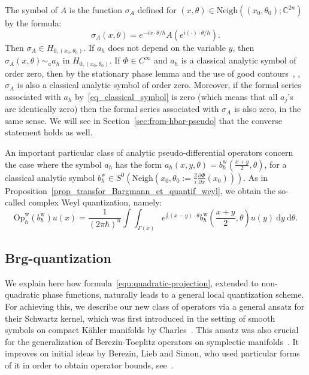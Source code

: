 \documentclass{article}
\newcommand{\Vois}{\mathrm{Neigh}}
\newcommand{\Op}{\mathrm{Op}}
\newcommand{\w}{\mathrm{w}}
\newcommand{\DD}{\:\!\mathrm{d}}
\newcommand{\intint}{\int\!\!\!\!\int}
\newcommand{\CM}{\mathbb{C}}
\newcommand{\h}{\hbar}
\begin{document}
The symbol of $A$ is the function $\sigma_A$ defined for
$(x, \theta) \in \Vois \left( (x_0, \theta_0); \CM^{2n}\right)$ by the
formula:
\[
\sigma_A(x, \theta) = e^{-i x\cdot \theta/ \hbar} A \left( e^{ i (
    \cdot)\cdot \theta/ \hbar} \right) .
\]
Then $\sigma_A\in H_{0,(x_0,\theta_0)}$. If $a_\h$ does not depend on
the variable $y$, then $\sigma_A(x,\theta) \sim_a a_\h$ in
$H_{0,(x_0,\theta_0)}$. If $\Phi\in C^\infty$ and $a_\h$ is a
classical analytic symbol of order zero, then by the stationary phase
lemma and the use of good contours~\cite[Lemme 3.2]{sj-asterisque-82},
\cite[Theorem 2.3.3, Lemma 2.4.2]{h-sj-minicours}, $\sigma_A$ is also
a classical analytic symbol of order zero. Moreover, if the formal
series associated with $a_\h$ by~\eqref{eq_classical_symbol} is zero
(which means that all $a_j$'s are identically zero) then the formal
series associated with $\sigma_A$ is also zero, in the same sense. We
will see in Section~\ref{sec:from-hbar-pseudo} that the converse
statement holds as well.

An important particular class of analytic pseudo-differential
operators concern the case where the symbol $a_\h$ has the form
$a_\h(x,y,\theta)=b^{\w}_\h(\frac{x+y}{2},\theta)$, for a classical
analytic symbol
$b^{\w}_\h\in S^0(\Vois\left( x_0, \theta_0 := \frac{2}{i}
  \frac{\partial \Phi}{\partial x} (x_0) \right))$.
As in Proposition~\ref{prop_transfor_Bargmann_et_quantif_weyl}, we
obtain the so-called complex Weyl quantization, namely:
\begin{equation}
  \label{equ:complex-weyl} 
  \Op^{\w}_\h(b^{\w}_{ \hbar}) u(x) = 
  \dfrac{1}{(2 \pi \hbar)^n} \intint_{\Gamma(x)} e^{\frac{i}{\h}(x-y) \cdot \theta} 
  b^{\w}_{ \hbar} \left( \dfrac{x+y}{2}, \theta \right) u(y) \DD y \DD \theta .
\end{equation}

\subsection{Brg-quantization}
\label{ssec:brg-quantization}

We explain here how formula~\eqref{equ:quadratic-projection}, extended
to non-quadratic phase functions, naturally leads to a general local
quantization scheme. For achieving this, we describe our new class of
operators via a general ansatz for their Schwartz kernel, which was
first introduced in the setting of smooth symbols on compact Kähler
manifolds by Charles~\cite{charles-toeplitz}. This ansatz was also
crucial for the generalization of Berezin-Toeplitz operators on
symplectic manifolds~\cite{Charles2016}. It improves on initial ideas
by Berezin, Lieb and Simon, who used particular forms of it in order
to obtain operator bounds, see~\cite[Definitions (2.2), (2.4)]{Simon80}.
\end{document}
